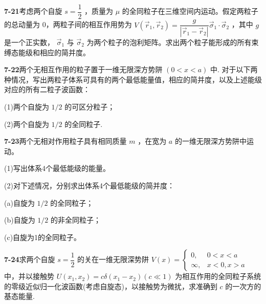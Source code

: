 \textbf{7-21}\quad 考虑两个自旋 $\displaystyle s = \dfrac{1}{2}$ ，质量为 $\displaystyle \mu$ 的全同粒子在三维空间内运动。假定两粒子的总动量为 0，两粒子间的相互作用势为 $\displaystyle V(\vec{r}_1, \vec{r}_2) = \dfrac{g}{|\vec{r}_1 - \vec{r}_2|} \vec{\sigma}_1 \cdot \vec{\sigma}_2$ ，其中 $\displaystyle g$ 是一个正实数， $\displaystyle \vec{\sigma}_1$ 与 $\displaystyle \vec{\sigma}_2$ 为两个粒子的泡利矩阵。求出两个粒子能形成的所有束缚态能级和相应的简并度。

\vfill

\newpage

\textbf{7-22}\quad 两个无相互作用的粒子置于一维无限深方势阱 $\displaystyle (0 < x < a)$ 中. 对于以下两种情况，写出两粒子体系可具有的两个最低能量值，相应的简并度，以及上述能级对应的所有二粒子波函数：

(1)两个自旋为 $\displaystyle 1/2$ 的可区分粒子；

(2)两个自旋为 $\displaystyle 1/2$ 的全同粒子.

\vfill

\newpage

\textbf{7-23}\quad 两个无相对作用粒子具有相同质量 $\displaystyle m$ ，在宽为 $\displaystyle a$ 的一维无限深方势阱中运动。

(1)写出体系4个最低能级的能量。

(2)对下述情况，分别求出体系4个最低能级的简并度：

(a)自旋为 $\displaystyle 1/2$ 的全同粒子；

(b)自旋为 $\displaystyle 1/2$ 的非全同粒子；

(c)自旋为1的全同粒子。

\vfill

\newpage

\textbf{7-24}\quad 求两个自旋 $\displaystyle s = \dfrac{1}{2}$ 的关在一维无限深势阱 $\displaystyle V(x) = \left\{ \begin{array}{ll}0, & 0 < x < a\\ \infty , & x < 0,x > a \end{array} \right.$ 中，并以接触势 $\displaystyle U(x_{1},x_{2}) = c\delta (x_{1} - x_{2})(c\ll 1)$ 为相互作用的全同粒子系统的零级近似归一化波函数(考虑自旋态)，以接触势为微扰，求准确到 $\displaystyle c$ 的一次方的基态能量.

\vfill

\newpage

